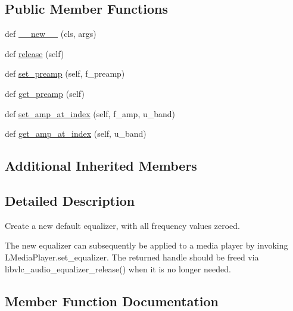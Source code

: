 \subsection*{Public Member Functions}
\begin{DoxyCompactItemize}
\item 
def \hyperlink{classvlc_1_1_audio_equalizer_acc2aa3fac6a63e8bac4f19efc327102b}{\+\_\+\+\_\+new\+\_\+\+\_\+} (cls, args)
\item 
def \hyperlink{classvlc_1_1_audio_equalizer_a4cd51e19135e5ad4a19eae3ea9c60537}{release} (self)
\item 
def \hyperlink{classvlc_1_1_audio_equalizer_ab88c103714ca495bcaabdc3d8d6b0986}{set\+\_\+preamp} (self, f\+\_\+preamp)
\item 
def \hyperlink{classvlc_1_1_audio_equalizer_ae95fe34603e8e5b5a646e309fb38f324}{get\+\_\+preamp} (self)
\item 
def \hyperlink{classvlc_1_1_audio_equalizer_aab7e0f4d960155c9ae37a54e56991124}{set\+\_\+amp\+\_\+at\+\_\+index} (self, f\+\_\+amp, u\+\_\+band)
\item 
def \hyperlink{classvlc_1_1_audio_equalizer_a6e57bd49d3e905307ae97d8f1398b72f}{get\+\_\+amp\+\_\+at\+\_\+index} (self, u\+\_\+band)
\end{DoxyCompactItemize}
\subsection*{Additional Inherited Members}


\subsection{Detailed Description}
\begin{DoxyVerb}Create a new default equalizer, with all frequency values zeroed.

The new equalizer can subsequently be applied to a media player by invoking
L{MediaPlayer.set_equalizer}.
The returned handle should be freed via libvlc_audio_equalizer_release() when
it is no longer needed.
\end{DoxyVerb}
 

\subsection{Member Function Documentation}
\mbox{\label{classvlc_1_1_audio_equalizer_acc2aa3fac6a63e8bac4f19efc327102b}} 
